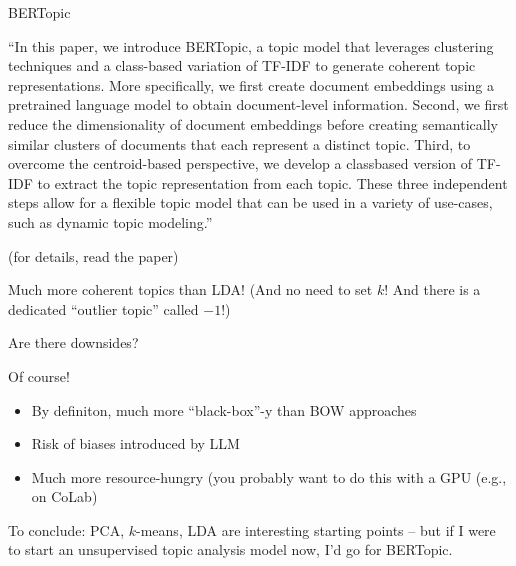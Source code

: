 \begin{frame}{BERTopic \parencite{Grootendorst2022}}

``In this paper, we introduce BERTopic, a topic model that leverages clustering techniques and a class-based variation of TF-IDF to generate coherent topic representations. More specifically, we first create document embeddings using a pretrained language model to obtain document-level information. Second, we first reduce the dimensionality of document embeddings before creating semantically similar clusters of documents that each represent a distinct topic. Third, to overcome the centroid-based perspective, we develop a classbased version of TF-IDF to extract the topic representation from each topic. These three independent steps allow for a flexible topic model that can be used in a variety of use-cases, such as dynamic topic modeling.''

\tiny{(for details, read the paper)}

\end{frame}




\begin{frame}{Much more coherent topics than LDA!}
  (And no need to set $k$! And there is a dedicated ``outlier topic'' called $-1$!)
\end{frame}


\begin{frame}{Are there downsides?}

  Of course!

  \begin{itemize}
  \item By definiton, much more ``black-box''-y than BOW approaches
  \item Risk of biases introduced by LLM
  \item Much more resource-hungry (you probably want to do this with a GPU (e.g., on CoLab)
  \end{itemize}
\end{frame}


\begin{frame}[standout]
To conclude: PCA, $k$-means, LDA are interesting starting points -- but if I were to start an unsupervised topic analysis model now, I'd go for BERTopic.

\end{frame}






